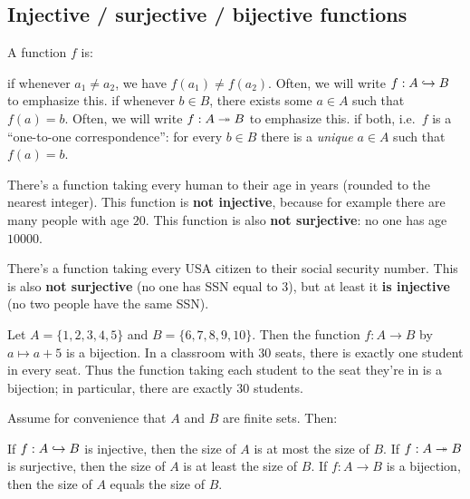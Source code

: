 \subsection{Injective / surjective / bijective functions}
\begin{definition}
	A function $f$ is:
	\begin{itemize}
		\ii {} if whenever $a_1 \neq a_2$, we have $f(a_1) \neq f(a_2)$.
		Often, we will write $f : A \hookrightarrow B$ to emphasize this.
		\ii {} if whenever $b \in B$, there exists some $a \in A$
		such that $f(a) = b$.
		Often, we will write $f : A \twoheadrightarrow B$ to emphasize this.
		\ii {} if both, i.e.\ $f$ is a ``one-to-one correspondence'':
		for every $b \in B$ there is a \emph{unique} $a \in A$
		such that $f(a) = b$.
	\end{itemize}
\end{definition}

\begin{example}
	\listhack
	\begin{enumerate}[(a)]
		\ii There's a function taking every human to their
		age in years (rounded to the nearest integer).
		This function is \textbf{not injective},
		because for example there are many people with age $20$.
		This function is also \textbf{not surjective}: no one has age $10000$.

		\ii There's a function taking every
		USA citizen to their social security number.
		This is also \textbf{not surjective} (no one has SSN equal to $3$),
		but at least it \textbf{is injective} (no two people have the same SSN).
	\end{enumerate}
\end{example}

\begin{example}
	\listhack
	\begin{enumerate}[(a)]
		\ii Let $A = \{1,2,3,4,5\}$ and $B = \{6,7,8,9,10\}$.
		Then the function $f : A \to B$ by $a \mapsto a+5$ is a bijection.
		\ii In a classroom with $30$ seats,
		there is exactly one student in every seat.
		Thus the function taking each student to the seat they're in
		is a bijection; in particular, there are exactly $30$ students.
	\end{enumerate}
\end{example}

\begin{remark}
	Assume for convenience that $A$ and $B$ are finite sets. Then:
	\begin{itemize}
		\ii If $f : A \hookrightarrow B$ is injective, then the size of $A$ is at most the size of $B$.
		\ii If $f : A \twoheadrightarrow B$ is surjective, then the size of $A$ is at least the size of $B$.
		\ii If $f : A \to B$ is a bijection, then the size of $A$ equals the size of $B$.
	\end{itemize}
\end{remark}

